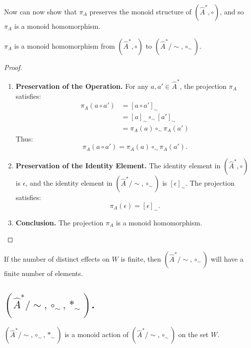 Now can now show that $\pi_{A}$ preserves the monoid structure of $(\hat{A}^{\ast}, \circ)$, and so $\pi_{A}$ is a monoid homomorphism.
\begin{proposition}
    $\pi_{A}$ is a monoid homomorphism from $(\hat{A}^{\ast}, \circ)$ to $(\hat{A}^{\ast}/\sim, \circ_{\sim})$.
\end{proposition}
\begin{proof}
\begin{enumerate}[(1)]
    \item \textbf{Preservation of the Operation.}
    For any $a, a' \in \hat{A}^{\ast}$, the projection $\pi_{A}$ satisfies:
    \begin{align}
        \pi_{A}(a \circ a') &= [a \circ a']_{\sim} \\
        &= [a]_{\sim} \circ_{\sim} [a']_{\sim} \\
        &= \pi_{A}(a) \circ_{\sim} \pi_{A}(a')
    \end{align}
    Thus:
    \begin{equation}
    \pi_{A}(a \circ a') = \pi_{A}(a) \circ_{\sim} \pi_{A}(a').
    \end{equation}

    \item \textbf{Preservation of the Identity Element.}
    The identity element in $(\hat{A}^{\ast}, \circ)$ is $\epsilon$, and the identity element in $(\hat{A}^{\ast}/\sim, \circ_{\sim})$ is $[\epsilon]_{\sim}$.
    The projection satisfies:
    \begin{equation}
    \pi_{A}(\epsilon) = [\epsilon]_{\sim}.
    \end{equation}
    
    \item \textbf{Conclusion.}
    The projection $\pi_{A}$ is a monoid homomorphism.
\end{enumerate}
\end{proof}

If the number of distinct effects on $W$ is finite, then $(\hat{A}^{\ast}/\sim, \circ_{\sim})$ will have a finite number of elements.

\subsection{$(\hat{A}^{\ast}/\sim, \circ_{\sim}, \ast_{\sim})$.}

\begin{proposition}
$(\hat{A}^{\ast}/\sim, \circ_{\sim}, \ast_{\sim})$ is a monoid action of $(\hat{A}^{\ast}/\sim, \circ_{\sim})$ on the set $W$.
\end{proposition}

